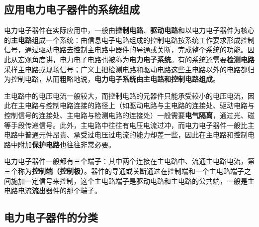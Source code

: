 
\subsection{应用电力电子器件的系统组成}

电力电子器件在实际应用中，一般由\textbf{控制电路}、\textbf{驱动电路}和以电力电子器件为核心的\textbf{主电路}组成一个系统：由信息电子电路组成的控制电路按系统工作要求形成控制信号，通过驱动电路去控制主电路中器件的导通或关断，完成整个系统的功能。因此从宏观角度讲，电力电子电路也被称为\textbf{电力电子系统}。有的系统还需要\textbf{检测电路}采样主电路或现场信号；广义上把检测电路和驱动电路这些主电路以外的电路都归为控制电路，从而粗略地说，\textbf{电力电子系统由主电路和控制电路组成}。

主电路中的电压电流一般较大，而控制电路的元器件只能承受较小的电压电流，因此在主电路与控制电路连接的路径上（如驱动电路与主电路的连接处、驱动电路与控制信号的连接处、主电路与检测电路的连接处）一般需要\textbf{电气隔离}，通过光、磁等手段传递信号。此外，主电路中往往有电压电流过冲，而电力电子器件一般比主电路中普通元件昂贵、承受过电压过电流的能力却差一些，因此在主电路和控制电路中附加\textbf{保护电路}也往往非常必要。

电力电子器件一般都有三个端子：其中两个连接在主电路中、流通主电路电流，第三个称为\textbf{控制端（控制极）}。器件的导通或关断通过在控制端和一个主电路端子之间施加一定信号来控制，这个主电路端子是驱动电路和主电路的公共端，一般是主电路电流\textbf{流出}器件的那个端子。

\subsection{电力电子器件的分类}

